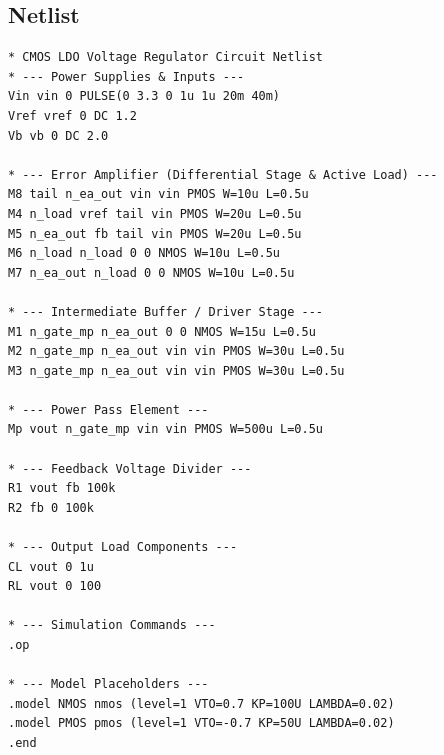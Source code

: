 \subsection{Netlist}
\begin{lstlisting}[caption={CMOS LDO Voltage Regulator Circuit Netlist}]
* CMOS LDO Voltage Regulator Circuit Netlist
* --- Power Supplies & Inputs ---
Vin vin 0 PULSE(0 3.3 0 1u 1u 20m 40m)
Vref vref 0 DC 1.2
Vb vb 0 DC 2.0

* --- Error Amplifier (Differential Stage & Active Load) ---
M8 tail n_ea_out vin vin PMOS W=10u L=0.5u
M4 n_load vref tail vin PMOS W=20u L=0.5u
M5 n_ea_out fb tail vin PMOS W=20u L=0.5u
M6 n_load n_load 0 0 NMOS W=10u L=0.5u
M7 n_ea_out n_load 0 0 NMOS W=10u L=0.5u

* --- Intermediate Buffer / Driver Stage ---
M1 n_gate_mp n_ea_out 0 0 NMOS W=15u L=0.5u
M2 n_gate_mp n_ea_out vin vin PMOS W=30u L=0.5u
M3 n_gate_mp n_ea_out vin vin PMOS W=30u L=0.5u

* --- Power Pass Element ---
Mp vout n_gate_mp vin vin PMOS W=500u L=0.5u

* --- Feedback Voltage Divider ---
R1 vout fb 100k
R2 fb 0 100k

* --- Output Load Components ---
CL vout 0 1u
RL vout 0 100

* --- Simulation Commands ---
.op

* --- Model Placeholders ---
.model NMOS nmos (level=1 VTO=0.7 KP=100U LAMBDA=0.02)
.model PMOS pmos (level=1 VTO=-0.7 KP=50U LAMBDA=0.02)
.end
\end{lstlisting}

